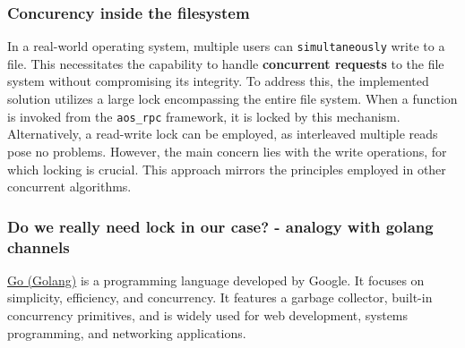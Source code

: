 \subsubsection{Concurency inside the filesystem}

In a real-world operating system, multiple users can \texttt{simultaneously} write to a file. This necessitates the capability to handle \textbf{concurrent requests} to the file system without compromising its integrity. To address this, the implemented solution utilizes a large lock encompassing the entire file system. When a function is invoked from the \texttt{aos\_rpc} framework, it is locked by this mechanism. Alternatively, a read-write lock can be employed, as interleaved multiple reads pose no problems. However, the main concern lies with the write operations, for which locking is crucial. This approach mirrors the principles employed in other concurrent algorithms. 

\subsubsection{Do we really need lock in our case? - analogy with golang channels}

\href{https://go.dev/}{Go (Golang)}   is a programming language developed by Google. It focuses on simplicity, efficiency, and concurrency. It features a garbage collector, built-in concurrency primitives, and is widely used for web development, systems programming, and networking applications.

